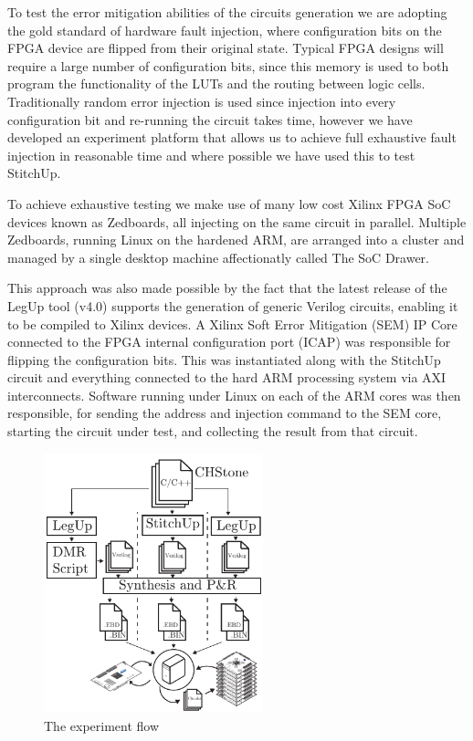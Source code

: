 
To test the error mitigation abilities of the circuits generation we are adopting the
gold standard of hardware fault injection, where configuration bits on the 
FPGA device are flipped from their original state.
Typical FPGA designs will require a large number of configuration bits, since this
memory is used to both program the functionality of the LUTs and the routing between
logic cells.
Traditionally random error injection is used since injection into every configuration
bit and re-running the circuit takes time, however we have developed an experiment
platform that allows us to achieve full exhaustive fault injection in reasonable time
and where possible we have used this to test StitchUp.

To achieve exhaustive testing we make use of many low cost Xilinx FPGA SoC devices known as
Zedboards, all injecting on the same circuit in parallel.
Multiple Zedboards, running Linux on the hardened ARM, are arranged into a cluster and
managed by a single desktop machine affectionatly called The SoC Drawer.

This approach was also made possible by the fact that the latest release of the LegUp tool
(v4.0) supports the generation of generic Verilog circuits, enabling it to be compiled
to Xilinx devices.
A Xilinx Soft Error Mitigation (SEM) IP Core connected to the FPGA internal configuration
port (ICAP) was responsible for flipping the configuration bits.
This was instantiated along with the StitchUp circuit and everything connected to the hard
ARM processing system via AXI interconnects.  
Software running under Linux on each of the ARM cores was then responsible, for sending the
address and injection command to the SEM core, starting the circuit under test, and
collecting the result from that circuit. 

\begin{figure}[t]
\centering
\includegraphics[width=2.5in]{./imgs/ExperimentFlowVert.pdf}
\caption{The experiment flow}
\label{fig:ExperimentFlow}
\end{figure}

